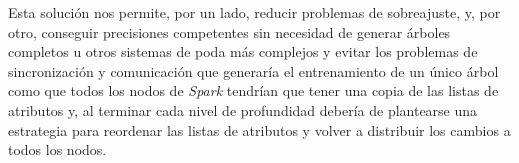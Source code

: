 Esta solución nos permite, por un lado, reducir problemas de sobreajuste, y, por otro, conseguir precisiones competentes sin necesidad de generar árboles completos u otros sistemas de poda más complejos y evitar los problemas de sincronización y comunicación que generaría el entrenamiento de un único árbol como que todos los nodos de \textit{Spark} tendrían que tener una copia de las listas de atributos y, al terminar cada nivel de profundidad debería de plantearse una estrategia para reordenar las listas de atributos y volver a distribuir los cambios a todos los nodos.

